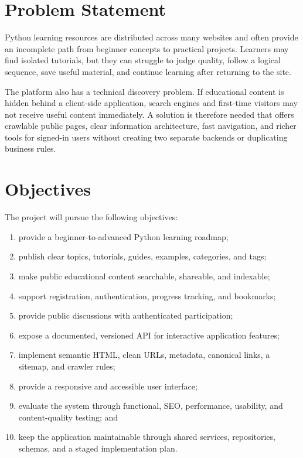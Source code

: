 \documentclass[11pt,a4paper]{article}
\begin{document}
\section{Problem Statement}

Python learning resources are distributed across many websites and often provide
an incomplete path from beginner concepts to practical projects. Learners may
find isolated tutorials, but they can struggle to judge quality, follow a logical
sequence, save useful material, and continue learning after returning to the site.

The platform also has a technical discovery problem. If educational content is
hidden behind a client-side application, search engines and first-time visitors
may not receive useful content immediately. A solution is therefore needed that
offers crawlable public pages, clear information architecture, fast navigation,
and richer tools for signed-in users without creating two separate backends or
duplicating business rules.

\section{Objectives}

The project will pursue the following objectives:

\begin{enumerate}
  \item provide a beginner-to-advanced Python learning roadmap;
  \item publish clear topics, tutorials, guides, examples, categories, and tags;
  \item make public educational content searchable, shareable, and indexable;
  \item support registration, authentication, progress tracking, and bookmarks;
  \item provide public discussions with authenticated participation;
  \item expose a documented, versioned API for interactive application features;
  \item implement semantic HTML, clean URLs, metadata, canonical links, a sitemap,
        and crawler rules;
  \item provide a responsive and accessible user interface;
  \item evaluate the system through functional, SEO, performance, usability, and
        content-quality testing; and
  \item keep the application maintainable through shared services, repositories,
        schemas, and a staged implementation plan.
\end{enumerate}
\end{document}
